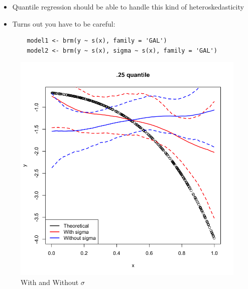 \begin{frame}
\begin{itemize}
\tightlist
\item
  Quantile regression should be able to handle this kind of
  heteroskedasticity
\item
  Turns out you have to be careful:

  \begin{lstlisting}
    model1 <- brm(y ~ s(x), family = 'GAL')
    model2 <- brm(y ~ s(x), sigma ~ s(x), family = 'GAL')
    \end{lstlisting}
\end{itemize}

\begin{figure}
\centering
\includegraphics{code_by_nico/functional/slides/wandwo.png}
\caption{With and Without \(\sigma\)}
\end{figure}
\end{frame}
